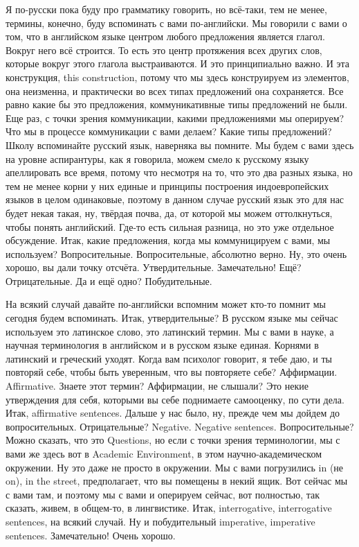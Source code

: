 \documentclass[main.tex]{subfiles}
\begin{document}
Я по-русски пока буду про грамматику говорить, но всё-таки, тем не менее, термины, конечно, буду вспоминать с вами по-английски.
Мы говорили с вами о том, что в английском языке центром любого предложения является глагол.
Вокруг него всё строится.
То есть это центр протяжения всех других слов, которые вокруг этого глагола выстраиваются.
И это принципиально важно.
И эта конструкция, this construction, потому что мы здесь конструируем из элементов, она неизменна, и практически во всех типах предложений она сохраняется.
Все равно какие бы это предложения, коммуникативные типы предложений не были.
Еще раз, с точки зрения коммуникации, какими предложениями мы оперируем?
Что мы в процессе коммуникации с вами делаем?
Какие типы предложений?
Школу вспоминайте русский язык, наверняка вы помните.
Мы будем с вами здесь на уровне аспирантуры, как я говорила, можем смело к русскому языку апеллировать все время, потому что несмотря на то, что это два разных языка, но тем не менее корни у них единые и принципы построения индоевропейских языков в целом одинаковые, поэтому в данном случае русский язык это для нас будет некая такая, ну, твёрдая почва, да, от которой мы можем оттолкнуться, чтобы понять английский.
Где-то есть сильная разница, но это уже отдельное обсуждение.
Итак, какие предложения, когда мы коммуницируем с вами, мы используем?
Вопросительные.
Вопросительные, абсолютно верно.
Ну, это очень хорошо, вы дали точку отсчёта.
Утвердительные.
Замечательно!
Ещё?
Отрицательные.
Да и ещё одно?
Побудительные.

На всякий случай давайте по-английски вспомним может кто-то помнит мы сегодня будем вспоминать.
Итак, утвердительные?
В русском языке мы сейчас используем это латинское слово, это латинский термин.
Мы с вами в науке, а научная терминология в английском и в русском языке единая.
Корнями в латинский и греческий уходят.
Когда вам психолог говорит, я тебе даю, и ты повторяй себе, чтобы быть уверенным, что вы повторяете себе?
Аффирмации.
Affirmative.
Знаете этот термин? Аффирмации, не слышали?
Это некие утверждения для себя, которыми вы себе поднимаете самооценку, по сути дела.
Итак, affirmative sentences.
Дальше у нас было, ну, прежде чем мы дойдем до вопросительных.
Отрицательные?
Negative.
Negative sentences.
Вопросительные?
Можно сказать, что это Questions, но если с точки зрения терминологии, мы с вами же здесь вот в Academic Environment, в этом научно-академическом окружении.
Ну это даже не просто в окружении.
Мы с вами погрузились in (не on), in the street, предполагает, что вы помещены в некий ящик.
Вот сейчас мы с вами там, и поэтому мы с вами и оперируем сейчас, вот полностью, так сказать, живем, в общем-то, в лингвистике.
Итак, interrogative, interrogative sentences, на всякий случай.
Ну и побудительный imperative, imperative sentences.
Замечательно!
Очень хорошо.
\end{document}
